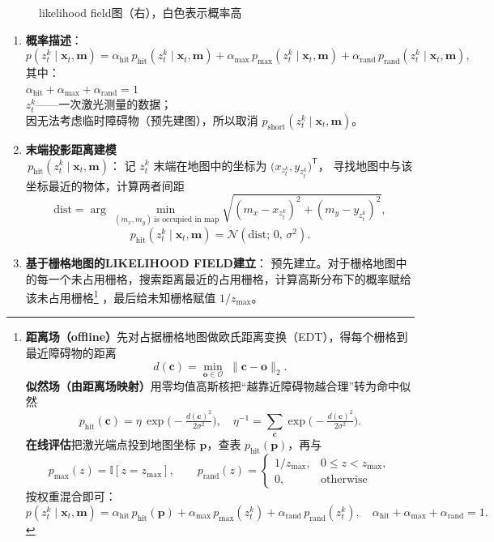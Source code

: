 \documentclass[../main.tex]{subfiles}
\begin{document}
\begin{enumerate}
\begin{itemize}
\begin{figure}[H]
        \caption{likelihood field图（右），白色表示概率高}
    \end{figure}
    \begin{enumerate}
      \item \textbf{概率描述}：
      \[
      p\!\left(z_t^{k}\mid \mathbf{x}_t,\mathbf{m}\right)
      =\alpha_{\mathrm{hit}}\,p_{\mathrm{hit}}\!\left(z_t^{k}\mid \mathbf{x}_t,\mathbf{m}\right)
      +\alpha_{\mathrm{max}}\,p_{\mathrm{max}}\!\left(z_t^{k}\mid \mathbf{x}_t,\mathbf{m}\right)
      +\alpha_{\mathrm{rand}}\,p_{\mathrm{rand}}\!\left(z_t^{k}\mid \mathbf{x}_t,\mathbf{m}\right),
      \]
      其中：\\
      $\alpha_{\mathrm{hit}}+\alpha_{\mathrm{max}}+\alpha_{\mathrm{rand}}=1$\\
      $z_t^{k}$——一次激光测量的数据；\\
      因无法考虑临时障碍物（预先建图），所以取消
      $p_{\mathrm{short}}\!\left(z_t^{k}\mid \mathbf{x}_t,\mathbf{m}\right)$。
    
      \item \textbf{末端投影距离建模}\\
      \,$p_{\mathrm{hit}}\!\left(z_t^{k}\mid \mathbf{x}_t,\mathbf{m}\right)$：
      记 $z_t^{k}$ 末端在地图中的坐标为 $\bigl(x_{z_t^{k}},y_{z_t^{k}}\bigr)^{\mathsf T}$，
      寻找地图中与该坐标最近的物体，计算两者间距
      \[
      \mathrm{dist}=\arg\min_{\ (m_x,m_y)\ \text{is occupied in map}}
      \sqrt{(m_x-x_{z_t^{k}})^{2}+(m_y-y_{z_t^{k}})^{2}},
      \]
      \[
      p_{\mathrm{hit}}\!\left(z_t^{k}\mid \mathbf{x}_t,\mathbf{m}\right)=\mathcal{N}\!\left(\mathrm{dist};\,0,\,\sigma^{2}\right).
      \]
    
    
      \item \textbf{基于栅格地图的\;LIKELIHOOD FIELD\;建立}：
      预先建立。对于栅格地图中的每一个未占用栅格，搜索距离最近的占用栅格，计算高斯分布下的概率赋给该未占用栅格\footnote{%
\textbf{距离场（offline）}\;先对占据栅格地图做欧氏距离变换（EDT），得每个栅格到最近障碍物的距离
\[
d(\mathbf{c})=\min_{\mathbf{o}\in\mathcal{O}}\;\lVert \mathbf{c}-\mathbf{o}\rVert_2 .
\]
\textbf{似然场（由距离场映射）}\;用零均值高斯核把“越靠近障碍物越合理”转为命中似然
\[
p_{\mathrm{hit}}(\mathbf{c})=\eta\,\exp\!\Big(-\tfrac{d(\mathbf{c})^2}{2\sigma^2}\Big),
\quad
\eta^{-1}=\!\!\sum_{\mathbf{c}}\exp\!\Big(-\tfrac{d(\mathbf{c})^2}{2\sigma^2}\Big).
\]
\textbf{在线评估}\;把激光端点投到地图坐标 $\mathbf{p}$，查表 $p_{\mathrm{hit}}(\mathbf{p})$，再与
\[
p_{\mathrm{max}}(z)=\mathbb{I}[z=z_{\max}],\qquad
p_{\mathrm{rand}}(z)=\begin{cases}1/z_{\max},&0\le z<z_{\max},\\[2pt]0,&\text{otherwise}\end{cases}
\]
按权重混合即可：
\[
p\!\left(z_t^{k}\mid \mathbf{x}_t,\mathbf{m}\right)=
\alpha_{\mathrm{hit}}\,p_{\mathrm{hit}}(\mathbf{p})
+\alpha_{\mathrm{max}}\,p_{\mathrm{max}}(z_t^{k})
+\alpha_{\mathrm{rand}}\,p_{\mathrm{rand}}(z_t^{k}),
\quad \alpha_{\mathrm{hit}}+\alpha_{\mathrm{max}}+\alpha_{\mathrm{rand}}=1.
\]
}%
，最后给未知栅格赋值 $1/z_{\max}$。
    

\end{enumerate}
\end{itemize}
\end{enumerate}
\end{document}
